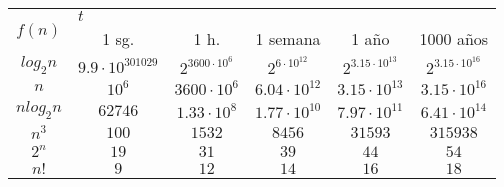 \documentclass{article}
\begin{document}
\begin{table}[!htbp]
\centering
\label{Tabla}
\begin{tabular}{|c|c|c|c|c|c|}
\hline
\multirow{2}{*}{$f(n)$}& \multicolumn{5}{l|}{\hfil$t$} \\ \cline{2-6}
& 1 sg. & 1 h. & 1 semana & 1 año & 1000 años \\ \hline
$log_{2}n$ &  $9.9 \cdot 10^{301029}$  &  $2^{3600 \cdot 10^{6}}$  &  $2^{6 \cdot 10^{12}}$  &  $2^{3.15\cdot 10^{13}}$  &  $2^{3.15\cdot 10^{16}}$ \\ \hline
$n$ &  $10^{6}$  &  $3600 \cdot 10^{6} $  &  $6.04 \cdot 10^{12}$  &  $3.15 \cdot 10^{13}$  & $3.15 \cdot 10^{16}$  \\ \hline
$nlog_{2}n$	&  $62746$  &  $1.33 \cdot 10^8$  &  $1.77 \cdot 10^{10}$  &  $7.97 \cdot 10^{11}$  &  $6.41 \cdot 10^{14}$ \\ \hline
$n^3$	&  $100$  &  $1532$  &  $8456$  &  $31593$  & $315938$  \\ \hline
$2^n$	&  $19$  &  $31$  & $39$   &  $44$  & $54$  \\ \hline
$n!$	& $9$ &	$12$ & $14$ & $16$ & $18$ \\ \hline

\end{tabular}
\end{table}
\end{document}
